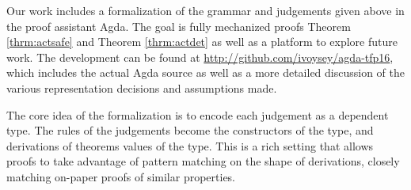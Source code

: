 Our work includes a formalization of the grammar and judgements given above
in the proof assistant Agda. The goal is fully mechanized proofs
Theorem \ref{thrm:actsafe} and Theorem \ref{thrm:actdet} as well as a
platform to explore future work. The development can be found at
\url{http://github.com/ivoysey/agda-tfp16}, which includes the actual Agda
source as well as a more detailed discussion of the various representation
decisions and assumptions made.

The core idea of the formalization is to encode each judgement as a
dependent type. The rules of the judgements become the constructors of the
type, and derivations of theorems values of the type. This is a rich
setting that allows proofs to take advantage of pattern matching on the
shape of derivations, closely matching on-paper proofs of similar
properties.


